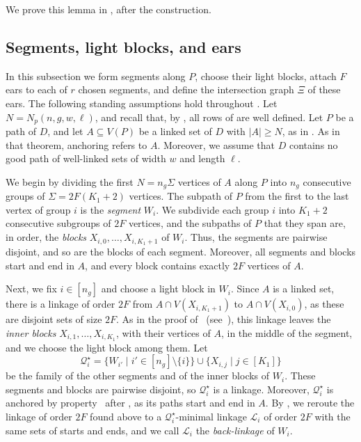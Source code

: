 \documentclass[fontsize=12pt,leading=14pt]{fullpaper}
\newcommand{\Lcal}{\mathcal{L}}
\newcommand{\Qcal}{\mathcal{Q}}
\begin{document}
We prove this lemma in , after the construction.

\subsection{Segments, light blocks, and ears}\label{sec:prep-ears}

In this subsection we form segments along $P$, choose their light blocks, attach $F$ ears to each of $r$ chosen segments, and define the intersection graph $\Xi$ of these ears.
The following standing assumptions hold throughout .
Let $N=N_p(n,g,w,\ell)$, and recall that, by , all rows of  are well defined.
Let $P$ be a path of $D$, and let $A\subseteq V(P)$ be a linked set of $D$ with $|A|\ge N$, as in .
As in that theorem, anchoring refers to $A$.
Moreover, we assume that $D$ contains no good path of well-linked sets of width $w$ and length $\ell$.

We begin by dividing the first $N=n_g\Sigma$ vertices of $A$ along $P$ into $n_g$ consecutive groups of $\Sigma=2F(K_1+2)$ vertices.
The subpath of $P$ from the first to the last vertex of group $i$ is the \emph{segment} $W_i$.
We subdivide each group $i$ into $K_1+2$ consecutive subgroups of $2F$ vertices, and the subpaths of $P$ that they span are, in order, the \emph{blocks} $X_{i,0},\dots,X_{i,K_1+1}$ of $W_i$.
Thus, the segments are pairwise disjoint, and so are the blocks of each segment.
Moreover, all segments and blocks start and end in $A$, and every block contains exactly $2F$ vertices of $A$.

Next, we fix $i\in[n_g]$ and choose a light block in $W_i$.
Since $A$ is a linked set, there is a linkage of order $2F$ from $A\cap V(X_{i,K_1+1})$ to $A\cap V(X_{i,0})$, as these are disjoint sets of size $2F$.
As in the proof of~\cite[Lemma~4.13]{CLNS26} (see~\cite[Figure~1]{CLNS26}), this linkage leaves the \emph{inner blocks} $X_{i,1},\dots,X_{i,K_1}$, with their vertices of $A$, in the middle of the segment, and we choose the light block among them.
Let
\[
  \Qcal^\star_i=\{W_{i'} \mid i'\in[n_g]\setminus\{i\}\}\cup\{X_{i,j} \mid j\in[K_1]\}
\]
be the family of the other segments and of the inner blocks of $W_i$.
These segments and blocks are pairwise disjoint, so $\Qcal^\star_i$ is a linkage.
Moreover, $\Qcal^\star_i$ is anchored by property~ after , as its paths start and end in $A$.
By , we reroute the linkage of order $2F$ found above to a $\Qcal^\star_i$-minimal linkage $\Lcal_i$ of order $2F$ with the same sets of starts and ends, and we call $\Lcal_i$ the \emph{back-linkage} of $W_i$.
\end{document}
